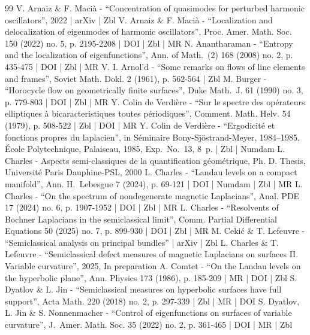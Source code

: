 \begin{thebibliography}{99}
V. Arnaiz \& F. Macià - “Concentration of quasimodes for perturbed harmonic oscillators”, 2022 | arXiv | Zbl
V. Arnaiz \& F. Macià - “Localization and delocalization of eigenmodes of harmonic oscillators”, Proc. Amer. Math. Soc. 150 (2022) no. 5, p. 2195-2208 | DOI | Zbl | MR
N. Anantharaman - “Entropy and the localization of eigenfunctions”, Ann. of Math. (2) 168 (2008) no. 2, p. 435-475 | DOI | Zbl | MR
V. I. Arnol’d - “Some remarks on flows of line elements and frames”, Soviet Math. Dokl. 2 (1961), p. 562-564 | Zbl
M. Burger - “Horocycle flow on geometrically finite surfaces”, Duke Math. J. 61 (1990) no. 3, p. 779-803 | DOI | Zbl | MR
Y. Colin de Verdière - “Sur le spectre des opérateurs elliptiques à bicaracteristiques toutes périodiques”, Comment. Math. Helv. 54 (1979), p. 508-522 | Zbl | DOI | MR
Y. Colin de Verdière - “Ergodicité et fonctions propres du laplacien”, in Séminaire Bony-Sjöstrand-Meyer, 1984–1985, École Polytechnique, Palaiseau, 1985, Exp. No. 13, 8 p. | Zbl | Numdam
L. Charles - Aspects semi-classiques de la quantification géométrique, Ph. D. Thesis, Université Paris Dauphine-PSL, 2000
L. Charles - “Landau levels on a compact manifold”, Ann. H. Lebesgue 7 (2024), p. 69-121 | DOI | Numdam | Zbl | MR
L. Charles - “On the spectrum of nondegenerate magnetic Laplacians”, Anal. PDE 17 (2024) no. 6, p. 1907-1952 | DOI | Zbl | MR
L. Charles - “Resolvents of Bochner Laplacians in the semiclassical limit”, Comm. Partial Differential Equations 50 (2025) no. 7, p. 899-930 | DOI | Zbl | MR
M. Cekić \& T. Lefeuvre - “Semiclassical analysis on principal bundles” | arXiv | Zbl
L. Charles \& T. Lefeuvre - “Semiclassical defect measures of magnetic Laplacians on surfaces II. Variable curvature”, 2025, In preparation
A. Comtet - “On the Landau levels on the hyperbolic plane”, Ann. Physics 173 (1986), p. 185-209 | MR | DOI | Zbl
S. Dyatlov \& L. Jin - “Semiclassical measures on hyperbolic surfaces have full support”, Acta Math. 220 (2018) no. 2, p. 297-339 | Zbl | MR | DOI
S. Dyatlov, L. Jin \& S. Nonnenmacher - “Control of eigenfunctions on surfaces of variable curvature”, J. Amer. Math. Soc. 35 (2022) no. 2, p. 361-465 | DOI | MR | Zbl

\end{thebibliography}

